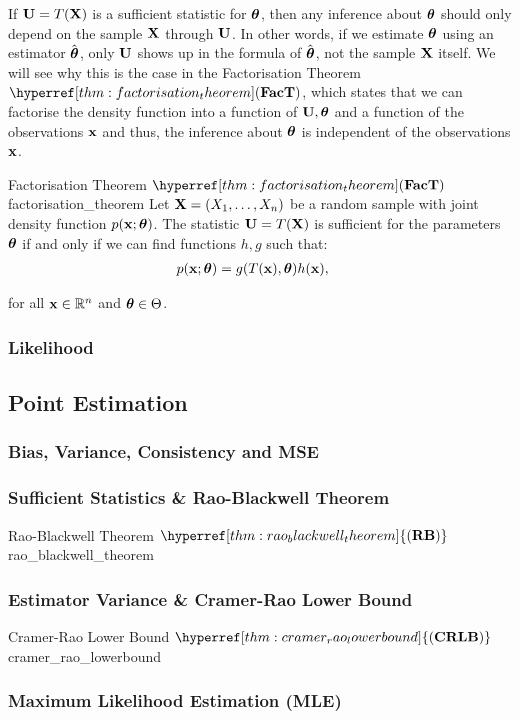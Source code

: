 \begin{definition}
    If ${\bf U}=T({\bf X})$ is a sufficient statistic for $\boldsymbol{\theta}$, then any inference about $\boldsymbol{\theta}$ should only depend on the sample ${\bf X}$ through ${\bf U}$. \color{blue}In other words, if we estimate $\boldsymbol{\theta}$ using an estimator $\hat{\boldsymbol{\theta}}$, only ${\bf U}$ shows up in the formula of $\hat{\boldsymbol{\theta}}$, not the sample ${\bf X}$ itself. We will see why this is the case in the Factorisation Theorem $\FacT$, which states that we can factorise the density function into a function of ${\bf U}, \boldsymbol{\theta}$ and a function of the observations ${\bf x}$ and thus, the inference about $\boldsymbol{\theta}$ is independent of the observations ${\bf x}$\color{black}.
\end{definition}

\begin{theorem}{Factorisation Theorem $\FacT$}{factorisation_theorem}
    Let ${\bf X} = (X_1, \dots, X_n)$ be a random sample with joint density function $p({\bf x};\boldsymbol{\theta})$. The statistic ${\bf U}=T({\bf X})$ is sufficient for the parameters $\boldsymbol{\theta}$ if and only if we can find functions $h, g$ such that:
    \begin{align*}
        p({\bf x};\boldsymbol{\theta}) &= g(T({\bf x}), \boldsymbol{\theta})h({\bf x}),
    \end{align*}

    \noindent for all ${\bf x}\in\mathbb{R}^n$ and $\boldsymbol{\theta}\in\Theta$.
\end{theorem}

\subsubsection{Likelihood}


\subsection{Point Estimation}
\newcommand{\RB}{\hyperref[thm:rao_blackwell_theorem]{(\mathrm{{\bf RB}})}}
\newcommand{\CRLB}{\hyperref[thm:cramer_rao_lowerbound]{(\mathrm{{\bf CRLB}})}}

\subsubsection{Bias, Variance, Consistency and MSE}

\subsubsection{Sufficient Statistics \& Rao-Blackwell Theorem}
\begin{theorem}{Rao-Blackwell Theorem $\RB$}{rao_blackwell_theorem}
    
\end{theorem}


\subsubsection{Estimator Variance \& Cramer-Rao Lower Bound}
\begin{theorem}{Cramer-Rao Lower Bound $\CRLB$}{cramer_rao_lowerbound}

\end{theorem}


\subsubsection{Maximum Likelihood Estimation (MLE)}
